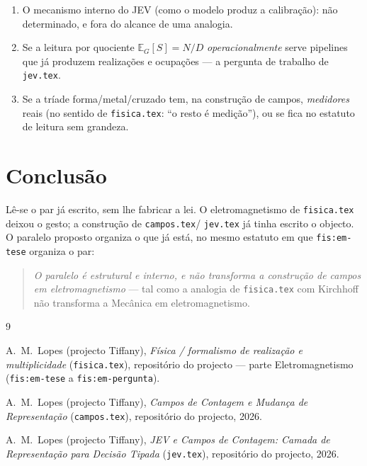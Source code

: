 \documentclass[11pt,a4paper]{article}
\begin{document}
\begin{enumerate}[leftmargin=1.5em]
\item O mecanismo interno do JEV (como o modelo produz a calibração): não
      determinado, e fora do alcance de uma analogia.
\item Se a leitura por quociente $\mathbb E_G[S]=N/D$ \emph{operacionalmente}
      serve pipelines que já produzem realizações e ocupações --- a pergunta
      de trabalho de \texttt{jev.tex}.
\item Se a tríade forma/metal/cruzado tem, na construção de campos,
      \emph{medidores} reais (no sentido de \texttt{fisica.tex}: ``o resto é
      medição''), ou se fica no estatuto de leitura sem grandeza.
\end{enumerate}

\section{Conclusão}\label{sec:conclusao}

Lê-se o par já escrito, sem lhe fabricar a lei. O eletromagnetismo de
\texttt{fisica.tex} deixou o gesto; a construção de \texttt{campos.tex}/
\texttt{jev.tex} já tinha escrito o objecto. O paralelo proposto organiza o
que já está, no mesmo estatuto em que \texttt{fis:em-tese} organiza o par:

\begin{center}
\qquad
{}
\qquad
{}
\end{center}

\begin{quote}
\emph{O paralelo é estrutural e interno, e não transforma a construção de
campos em eletromagnetismo} --- tal como a analogia de \texttt{fisica.tex} com
Kirchhoff não transforma a Mecânica em eletromagnetismo.
\end{quote}

\begin{thebibliography}{9}

A.~M.~Lopes (projecto Tiffany),
\emph{Física / formalismo de realização e multiplicidade}
(\texttt{fisica.tex}), repositório do projecto --- parte Eletromagnetismo
(\texttt{fis:em-tese} a \texttt{fis:em-pergunta}).

A.~M.~Lopes (projecto Tiffany),
\emph{Campos de Contagem e Mudança de Representação}
(\texttt{campos.tex}), repositório do projecto, 2026.

A.~M.~Lopes (projecto Tiffany),
\emph{JEV e Campos de Contagem: Camada de Representação para Decisão Tipada}
(\texttt{jev.tex}), repositório do projecto, 2026.

\end{thebibliography}
\end{document}
